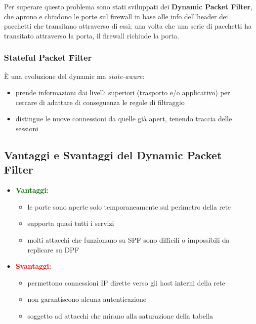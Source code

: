 \noindent Per superare questo problema sono stati sviluppati dei \textbf{Dynamic Packet Filter},
che aprono e chiudono le porte sul firewall in base alle info dell'header dei 
pacchetti che transitano attraverso di essi; una volta che una serie di pacchetti 
ha transitato attraverso la porta, il firewall richiude la porta.

\subsubsection{Stateful Packet Filter}
È una evoluzione del dynamic ma \textit{state-aware}:
\begin{itemize}
    \item prende informazioni dai livelli superiori (trasporto e/o applicativo) per cercare di adattare 
    di conseguenza le regole di filtraggio 
    \item distingue le nuove connessioni da quelle già apert, tenendo traccia delle sessioni
\end{itemize}

\subsection{Vantaggi e Svantaggi del Dynamic Packet Filter}
\begin{itemize}
    \item \textbf{\textcolor{darkgreen}{Vantaggi:}}
    \begin{itemize}
        \item le porte sono aperte solo temporaneamente sul perimetro della rete 
        \item supporta quasi tutti i servizi 
        \item molti attacchi che funzionano su SPF sono difficili o impossibili da replicare 
        su DPF
    \end{itemize}
    \item \textbf{\textcolor{red}{Svantaggi:}}
    \begin{itemize}
        \item permettono connessioni IP dirette verso gli host interni della rete
        \item non garantiscono alcuna autenticazione
        \item soggetto ad attacchi che mirano alla saturazione della tabella  
    \end{itemize}
\end{itemize}

